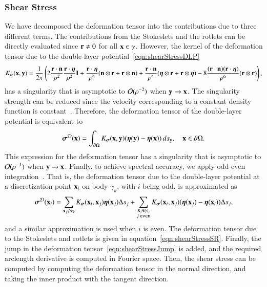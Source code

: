 \documentclass[preprint, 10pt]{elsarticle}
\begin{document}
\subsubsection{Shear Stress}
We have decomposed the deformation tensor into the contributions due to
three different terms.  The contributions from the Stokeslets and the
rotlets can be directly evaluated since ${\mathbf{r}} \neq 0$ for all ${\mathbf{x}} \in
\gamma$.  However, the kernel of the deformation tensor due to the
double-layer potential~\eqref{eqn:shearStressDLP} 
\begin{align*}
  K_{\boldsymbol\sigma}({\mathbf{x}},{\mathbf{y}}) = \frac{1}{2\pi} \left(
    2\frac{{\mathbf{r}} \cdot {\mathbf{n}}}{\rho^2} \frac{{\mathbf{r}} \cdot {\boldsymbol\eta}}{\rho^2} {\mathbf{I}} + 
    \frac{{\mathbf{r}} \cdot {\boldsymbol\eta}}{\rho^4} ({\mathbf{n}} \otimes {\mathbf{r}} + {\mathbf{r}} \otimes {\mathbf{n}}) +
    \frac{{\mathbf{r}} \cdot {\mathbf{n}}}{\rho^4} ({\boldsymbol\eta} \otimes {\mathbf{r}} + {\mathbf{r}} \otimes {\boldsymbol\eta}) - 
    8\frac{({\mathbf{r}} \cdot {\mathbf{n}})({\mathbf{r}} \cdot {\boldsymbol\eta})}{\rho^6}({\mathbf{r}} \otimes {\mathbf{r}})
  \right),
\end{align*}
has a singularity that is asymptotic to ${\mathcal{O}}(\rho^{-2})$ when ${\mathbf{y}}
\rightarrow {\mathbf{x}}$.  The singularity strength can be reduced since the
velocity corresponding to a constant density function is
constant~\cite{poz1992}.  Therefore, the deformation tensor of the
double-layer potential is equivalent to
\begin{align*}
  {\boldsymbol\sigma}^{{\mathcal{D}}}({\mathbf{x}}) = \int_{{\partial}\Omega}K_{\boldsymbol\sigma}({\mathbf{x}},{\mathbf{y}})
      ({\boldsymbol\eta}({\mathbf{y}}) - {\boldsymbol\eta}({\mathbf{x}})) \, ds_{{\mathbf{y}}}, \quad {\mathbf{x}} \in {\partial}\Omega.
\end{align*}
This expression for the deformation tensor has a singularity that is
asymptotic to ${\mathcal{O}}(\rho^{-1})$ when ${\mathbf{y}} \rightarrow {\mathbf{x}}$.  Finally,
to achieve spectral accuracy, we apply odd-even
integration~\cite{sid-isr1988}.  That is, the deformation tensor due to
the double-layer potential at a discretization point ${\mathbf{x}}_i$ on body
$\gamma_k$, with $i$ being odd, is approximated as
\begin{align}
  {\boldsymbol\sigma}^{{\mathcal{D}}}({\mathbf{x}}_i) = \sum_{{\mathbf{x}}_j \notin \gamma_k}
    K_{\boldsymbol\sigma}({\mathbf{x}}_i,{\mathbf{x}}_j) {\boldsymbol\eta}({\mathbf{x}}_j) \Delta s_j + 
  \sum_{\substack{{\mathbf{x}}_j \in \gamma_k \\ j \: \mathtt{even}}}
    K_{\boldsymbol\sigma}({\mathbf{x}}_i,{\mathbf{x}}_j) ({\boldsymbol\eta}({\mathbf{x}}_j) - {\boldsymbol\eta}({\mathbf{x}}_i)) \Delta s_j,
  \label{eqn:stressOddEven}
\end{align}
and a similar approximation is used when $i$ is even.  The deformation
tensor due to the Stokeslets and rotlets is given in
equation~\eqref{eqn:shearStressSR}.  Finally, the jump in the
deformation tensor~\eqref{eqn:shearStressJump} is added, and the
required arclength derivative is computed in Fourier space.  Then, the
shear stress can be computed by computing the deformation tensor in the
normal direction, and taking the inner product with the tangent
direction.
\end{document}
